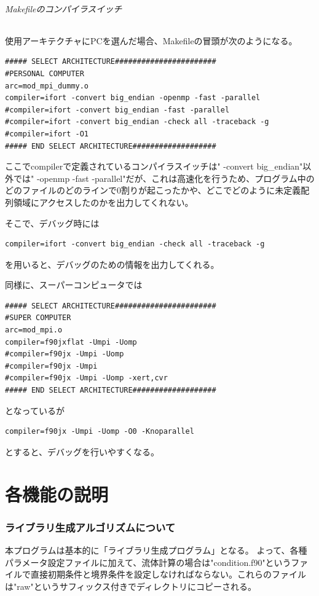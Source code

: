 \documentclass{jsarticle}
\begin{document}
\paragraph{Makefileのコンパイラスイッチ}%
使用アーキテクチャにPCを選んだ場合、Makefileの冒頭が次のようになる。
\begin{verbatim}
##### SELECT ARCHITECTURE#######################
#PERSONAL COMPUTER
arc=mod_mpi_dummy.o
compiler=ifort -convert big_endian -openmp -fast -parallel
#compiler=ifort -convert big_endian -fast -parallel
#compiler=ifort -convert big_endian -check all -traceback -g
#compiler=ifort -O1
##### END SELECT ARCHITECTURE###################
\end{verbatim}
ここでcompilerで定義されているコンパイラスイッチは" -convert big\_endian"以外では" -openmp -fast -parallel"だが、これは高速化を行うため、プログラム中のどのファイルのどのラインで0割りが起こったかや、どこでどのように未定義配列領域にアクセスしたのかを出力してくれない。

そこで、デバッグ時には
\begin{verbatim}
compiler=ifort -convert big_endian -check all -traceback -g
\end{verbatim}
を用いると、デバッグのための情報を出力してくれる。

同様に、スーパーコンピュータでは
\begin{verbatim}
##### SELECT ARCHITECTURE#######################
#SUPER COMPUTER
arc=mod_mpi.o
compiler=f90jxflat -Umpi -Uomp
#compiler=f90jx -Umpi -Uomp
#compiler=f90jx -Umpi
#compiler=f90jx -Umpi -Uomp -xert,cvr
##### END SELECT ARCHITECTURE###################
\end{verbatim}
となっているが
\begin{verbatim}
compiler=f90jx -Umpi -Uomp -O0 -Knoparallel
\end{verbatim}
とすると、デバッグを行いやすくなる。
\newpage

\part{各機能の説明}
\newpage
\section{ライブラリ生成アルゴリズムについて}%
本プログラムは基本的に「ライブラリ生成プログラム」となる。
よって、各種パラメータ設定ファイルに加えて、流体計算の場合は"condition.f90"というファイルで直接初期条件と境界条件を設定しなければならない。これらのファイルは"raw"というサフィックス付きでディレクトリにコピーされる。
\end{document}
